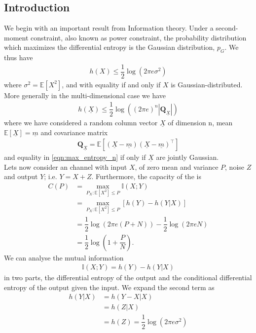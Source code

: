 \subsection{Introduction}
We begin with an important result from Information theory. Under a second-moment constraint, also known as power constraint, the probability distribution which maximizes the differential entropy is the Gaussian distribution, $p_G$. We thus have
\begin{align}
\label{eqn:max_entropy_scalar}
	h(X) \leq \dfrac{1}{2} \log \left(2 \pi e \sigma^2 \right)
\end{align}
where $\sigma^2 = \mathbb{E}[X^2]$, and with equality if and only if $X$ is Gaussian-distributed. More generally in the multi-dimensional case we have  
\begin{align}
\label{eqn:max_entropy_n}
	h(\underline{X}) \leq \dfrac{1}{2} \log \left((2 \pi e)^n |\textbf{Q}_{\underline{X}}| \right)
\end{align}
where we have considered a random column vector $\underline{X}$ of dimension n, mean $\mathbb{E}[\underline{X}]= \underline{m}$ and covariance matrix
\begin{align}
	\textbf{Q}_{\underline{X}}  = \mathbb{E}[(\underline{X} - \underline{m})(\underline{X} - \underline{m})^\intercal]
\end{align}
and equality in \ref{eqn:max_entropy_n} if only if $\underline{X}$ are jointly Gaussian.\\
Lets now consider an  channel with input $X$, of zero mean and variance $P$, noise $Z$ and output $Y$; i.e. $Y = X + Z$. Furthermore, the capacity of the  is
\begin{align}
\label{eqn:awgn_cap}
	C(P) &= \max\limits_{P_X:\mathbb{E}[X^2] \leq P} \mathbb{I}(X;Y)\\
	& = \max\limits_{P_X:\mathbb{E}[X^2] \leq P}[h(Y) - h(Y \vert X)]\\
	& = \dfrac{1}{2} \log (2 \pi e (P+N)) - \dfrac{1}{2} \log (2 \pi e N)\\
	& = \dfrac{1}{2} \log \left(1 + \dfrac{P}{N} \right). 
\end{align}
We can analyse the mutual information
\begin{align}
\label{eqn:MI}
	\mathbb{I}(X;Y) = h(Y) - h(Y \vert X)
\end{align}
in two parts, the differential entropy of the output and the conditional differential entropy of the output given the input.
We expand the second term as
\begin{align}
	h(Y \vert X) &= h(Y - X \vert X) \\
	& = h(Z \vert X)\\
	& = h(Z) = \dfrac{1}{2} \log \left(2 \pi e \sigma^2 \right)
\end{align}
